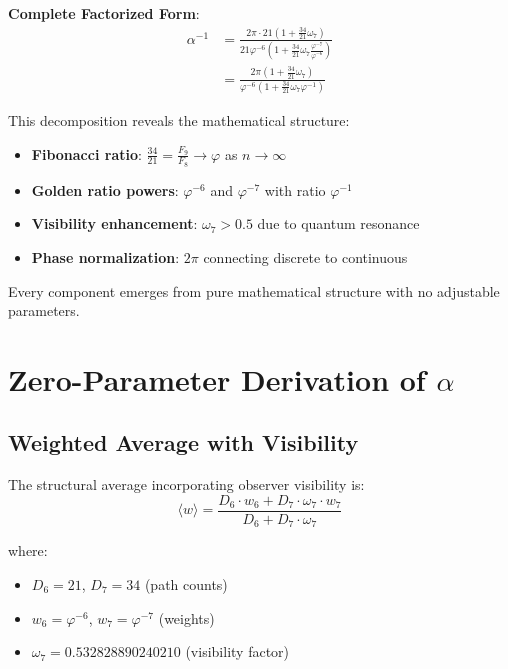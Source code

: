 \documentclass[%
 reprint,
 amsmath,amssymb,
 aps,
 prd,
 10pt,
 nofootinbib,      %
 longbibliography  %
]{revtex4-2}
\theoremstyle{definition}
\theoremstyle{remark}
\begin{document}
\textbf{Complete Factorized Form}:
\begin{align}
\alpha^{-1} &= \frac{2\pi \cdot 21(1 + \frac{34}{21}\omega_7)}{21 \varphi^{-6}(1 + \frac{34}{21}\omega_7 \frac{\varphi^{-7}}{\varphi^{-6}})} \\
&= \frac{2\pi(1 + \frac{34}{21}\omega_7)}{\varphi^{-6}(1 + \frac{34}{21}\omega_7 \varphi^{-1})}
\end{align}

This decomposition reveals the mathematical structure:
\begin{itemize}
\item \textbf{Fibonacci ratio}: $\frac{34}{21} = \frac{F_9}{F_8} \to \varphi$ as $n \to \infty$
\item \textbf{Golden ratio powers}: $\varphi^{-6}$ and $\varphi^{-7}$ with ratio $\varphi^{-1}$
\item \textbf{Visibility enhancement}: $\omega_7 > 0.5$ due to quantum resonance
\item \textbf{Phase normalization}: $2\pi$ connecting discrete to continuous
\end{itemize}

Every component emerges from pure mathematical structure with no adjustable parameters.

\section{Zero-Parameter Derivation of \texorpdfstring{$\alpha$}{α}}
\label{sec:derivation}

\subsection{Weighted Average with Visibility}

The structural average incorporating observer visibility is:
\begin{equation}
\langle w \rangle = \frac{D_6 \cdot w_6 + D_7 \cdot \omega_7 \cdot w_7}{D_6 + D_7 \cdot \omega_7}
\end{equation}

where:
\begin{itemize}
\item $D_6 = 21$, $D_7 = 34$ (path counts)
\item $w_6 = \varphi^{-6}$, $w_7 = \varphi^{-7}$ (weights)
\item $\omega_7 = 0.532828890240210$ (visibility factor)
\end{itemize}
\end{document}
